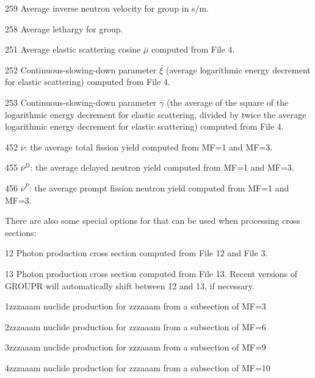 \begin{list}{ }{=.25in\leftmargin=1in=.75in}
\begin{singlespace}
\item[\underbar{\cword{mtd}}] 
\item[259] Average inverse neutron velocity for group in s/m.
\item[258] Average lethargy for group.
\item[251] Average elastic scattering cosine $\overline\mu$
               computed from File 4.
\item[252] Continuous-slowing-down parameter $\overline\xi$
               (average logarithmic energy decrement for elastic
               scattering) computed from File 4.
\item[253] Continuous-slowing-down parameter $\overline\gamma$
               (the average of the square of the logarithmic energy
               decrement for elastic scattering, divided by twice the
               average logarithmic energy decrement for elastic
               scattering) computed from File 4.
\item[452] $\overline\nu$: the average total fission yield
               computed from MF=1 and MF=3.
\item[455] $\overline\nu^D$: the average delayed neutron yield
               computed from MF=1 and MF=3.
\item[456] $\overline\nu^P$: the average prompt fission neutron
               yield computed from MF=1 and MF=3.
\end{singlespace}
\end{list}

\noindent
There are also some special options for  that can
be used when processing cross sections:

\begin{list}{ }{=.25in\leftmargin=1in=.75in}
\begin{singlespace}

\item[\underbar{\cword{mfd}}] 
\item[12] Photon production cross section computed from File 12 and File 3.
\item[13] Photon production cross section computed from File 13.
          Recent versions of GROUPR will automatically shift
          between 12 and 13, if necessary.
\item[1zzzaaam] nuclide production for zzzaaam from a subsection of MF=3
\item[2zzzaaam] nuclide production for zzzaaam from a subsection of MF=6
\item[3zzzaaam] nuclide production for zzzaaam from a subsection of MF=9
\item[4zzzaaam] nuclide production for zzzaaam from a subsection of MF=10
\end{singlespace}
\end{list}

